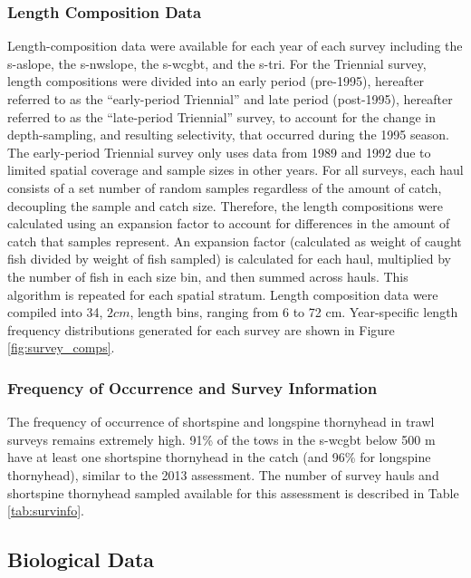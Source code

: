 \documentclass[11pt,
  letterpaper,
]{article}
\begin{document}
\hypertarget{length-composition-data}{%
\subsubsection{Length Composition Data}\label{length-composition-data}}

Length-composition data were available for each year of each survey including the \gls{s-aslope}, the \gls{s-nwslope}, the \gls{s-wcgbt}, and the \gls{s-tri}. For the Triennial survey, length compositions were divided into an early period (pre-1995), hereafter referred to as the ``early-period Triennial'' and late period (post-1995), hereafter referred to as the ``late-period Triennial'' survey, to account for the change in depth-sampling, and resulting selectivity, that occurred during the 1995 season. The early-period Triennial survey only uses data from 1989 and 1992 due to limited spatial coverage and sample sizes in other years. For all surveys, each haul consists of a set number of random samples regardless of the amount of catch, decoupling the sample and catch size. Therefore, the length compositions were calculated using an expansion factor to account for differences in the amount of catch that samples represent. An expansion factor (calculated as weight of caught fish divided by weight of fish sampled) is calculated for each haul, multiplied by the number of fish in each size bin, and then summed across hauls. This algorithm is repeated for each spatial stratum. Length composition data were compiled into 34, \(2 cm\), length bins, ranging from 6 to 72 cm. Year-specific length frequency distributions generated for each survey are shown in Figure \ref{fig:survey_comps}.

\hypertarget{frequency-of-occurrence-and-survey-information}{%
\subsubsection{Frequency of Occurrence and Survey Information}\label{frequency-of-occurrence-and-survey-information}}

The frequency of occurrence of shortspine and longspine thornyhead in trawl surveys remains extremely high. 91\% of the tows in the \gls{s-wcgbt} below 500 m have at least one shortspine thornyhead in the catch (and 96\% for longspine thornyhead), similar to the 2013 assessment. The number of survey hauls and shortspine thornyhead sampled available for this assessment is described in Table \ref{tab:survinfo}.

\hypertarget{biological-data}{%
\subsection{Biological Data}\label{biological-data}}
\end{document}
